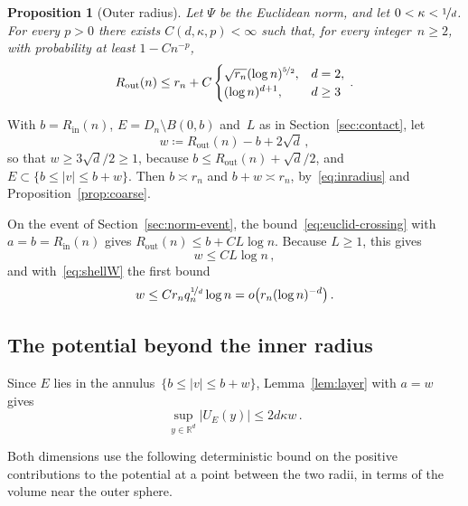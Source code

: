 \documentclass[11pt]{amsart}
\theoremstyle{plain}
\newtheorem{proposition}[theorem]{Proposition}
\theoremstyle{definition}
\newcommand{\R}{\mathbb R}
\newcommand{\drift}{\kappa}
\newcommand{\gauge}{\Psi}
\newcommand{\nf}{\nicefrac}
\newcommand{\Rin}{R_{\mathrm{in}}}
\newcommand{\Rout}{R_{\mathrm{out}}}
\numberwithin{equation}{section}
\begin{document}
\begin{proposition}[Outer radius]\label{prop:stronger-outer}
Let $\gauge$ be the Euclidean norm, and let $0<\drift<\nf{1}{d}$. For every $p>0$ there exists $C(d,\drift,p)<\infty$ such that, for every integer~$n\geq2$, with probability at least $1-Cn^{-p}$,
\begin{equation*}
\Rout(n)\leq r_n+C\begin{cases}\sqrt{r_n}(\log n)^{\nf52},&d=2,\\(\log n)^{d+1},&d\geq3\end{cases}\, .
\end{equation*}
\end{proposition}

With $b=\Rin(n)$, $E=D_n\setminus B(0,b)$ and~$L$ as in Section~\ref{sec:contact}, let
\begin{equation*}
w\coloneqq\Rout(n)-b+2\sqrt d\, ,
\end{equation*}
so that $w\geq3\sqrt d/2\geq1$, because $b\leq\Rout(n)+\sqrt d/2$, and $E\subset\{b\leq|v|\leq b+w\}$. Then $b\asymp r_n$ and $b+w\asymp r_n$, by~\eqref{eq:inradius} and Proposition~\ref{prop:coarse}.

On the event of Section~\ref{sec:norm-event}, the bound~\eqref{eq:euclid-crossing} with $a=b=\Rin(n)$ gives $\Rout(n)\leq b+CL\log n$. Because $L\geq1$, this gives
\begin{equation}\label{eq:outer-width-occupation}
w\leq CL\log n\, ,
\end{equation}
and with~\eqref{eq:shellW} the first bound
\begin{equation}\label{eq:width-preliminary}
w\leq Cr_nq_n^{\nf1d}\log n=o\bigl(r_n(\log n)^{-d}\bigr)\, .
\end{equation}

\subsection{The potential beyond the inner radius}\label{sec:outer-potential}

Since $E$ lies in the annulus~$\{b\leq|v|\leq b+w\}$, Lemma~\ref{lem:layer} with $a=w$ gives
\begin{equation}\label{eq:annulus-potential}
\sup_{y\in\R^d}|U_E(y)|\leq2d\drift w\, .
\end{equation}

Both dimensions use the following deterministic bound on the positive contributions to the potential at a point between the two radii, in terms of the volume near the outer sphere.
\end{document}
